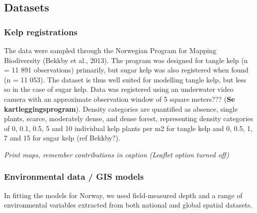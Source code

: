 \documentclass[
]{article}
\begin{document}
\hypertarget{datasets}{%
\subsection{Datasets}\label{datasets}}

\hypertarget{kelp-registrations}{%
\subsubsection{Kelp registrations}\label{kelp-registrations}}

The data were sampled through the Norwegian Program for Mapping
Biodiversity (Bekkby et al., 2013). The program was designed for tangle
kelp (n = 11 891 observations) primarily, but sugar kelp was also
registered when found (n = 11 053). The dataset is thus well suited for
modelling tangle kelp, but less so in the case of sugar kelp. Data was
registered using an underwater video camera with an approximate
observation window of 5 square meters??? (\textbf{Se
kartleggingsprogram}). Density categories are quantified as absence,
single plants, scarce, moderately dense, and dense forest, representing
density categories of 0, 0.1, 0.5, 5 and 10 individual kelp plants per
m2 for tangle kelp and 0, 0.5, 1, 7 and 15 for sugar kelp (ref Bekkby?).

\emph{Print maps, remember contributions in caption (Leaflet option
turned off)}

\hypertarget{environmental-data-gis-models}{%
\subsubsection{Environmental data / GIS
models}\label{environmental-data-gis-models}}

In fitting the models for Norway, we used field-measured depth and a
range of environmental variables extracted from both national and global
spatial datasets.
\end{document}
